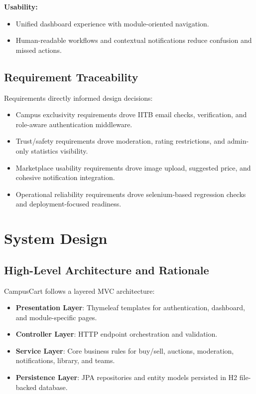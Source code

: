 \documentclass[12pt,a4paper]{article}
\begin{document}
\textbf{Usability:}
\begin{itemize}[leftmargin=*]
    \item Unified dashboard experience with module-oriented navigation.
    \item Human-readable workflows and contextual notifications reduce confusion and missed actions.
\end{itemize}

\subsection{Requirement Traceability}
Requirements directly informed design decisions:
\begin{itemize}[leftmargin=*]
    \item Campus exclusivity requirements drove IITB email checks, verification, and role-aware authentication middleware.
    \item Trust/safety requirements drove moderation, rating restrictions, and admin-only statistics visibility.
    \item Marketplace usability requirements drove image upload, suggested price, and cohesive notification integration.
    \item Operational reliability requirements drove selenium-based regression checks and deployment-focused readiness.
\end{itemize}

\newpage
\section{System Design}

\subsection{High-Level Architecture and Rationale}
CampusCart follows a layered MVC architecture:
\begin{itemize}[leftmargin=*]
    \item \textbf{Presentation Layer}: Thymeleaf templates for authentication, dashboard, and module-specific pages.
    \item \textbf{Controller Layer}: HTTP endpoint orchestration and validation.
    \item \textbf{Service Layer}: Core business rules for buy/sell, auctions, moderation, notifications, library, and teams.
    \item \textbf{Persistence Layer}: JPA repositories and entity models persisted in H2 file-backed database.
\end{itemize}
\end{document}
